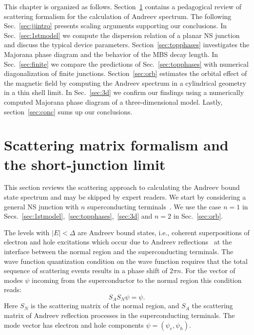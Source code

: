 This chapter is organized as follows.
Section~\ref{sec:formalism} contains a pedagogical review of scattering formalism for the calculation of Andreev spectrum.
The following Sec.~\ref{sec:jjintro} presents scaling arguments supporting our conclusions.
In Sec.~\ref{sec:1stmodel} we compute the dispersion relation of a planar NS junction and discuss the typical device parameters.
Section~\ref{sec:topphases} investigates the Majorana phase diagram and the behavior of the MBS decay length.
In Sec.~\ref{sec:finite} we compare the predictions of Sec.~\ref{sec:topphases} with numerical diagonalization of finite junctions.
Section~\ref{sec:orb} estimates the orbital effect of the magnetic field by computing the Andreev spectrum in a cylindrical geometry in a thin shell limit.
In Sec.~\ref{sec:3d} we confirm our findings using a numerically computed Majorana phase diagram of a three-dimensional model.
Lastly, section~\ref{sec:conc} sums up our conclusions.

\section{Scattering matrix formalism and the short-junction limit}
\label{sec:formalism}
This section reviews the scattering approach to calculating the Andreev bound state spectrum and may be skipped by expert readers.
We start by considering a general NS junction with $n$ superconducting terminals~\cite{Heck2014}.
We use the case $n=1$ in Secs.~\ref{sec:1stmodel},~\ref{sec:topphases},~\ref{sec:3d} and $n=2$ in Sec.~\ref{sec:orb}.

The levels with $|E|<\Delta$ are Andreev bound states, i.e., coherent superpositions of electron and hole excitations which occur due to Andreev reflections~\cite{Andreev1964} at the interface between the normal region and the superconducting terminals.
The wave function quantization condition on the wave function requires that the total sequence of scattering events results in a phase shift of $2\pi n$.
For the vector of modes $\psi$ incoming from the superconductor to the normal region this condition reads:
\begin{equation}\label{bound}
S_A S_N\psi=\psi.
\end{equation}
Here $S_N$ is the scattering matrix of the normal region, and $S_A$ the scattering matrix of Andreev reflection processes in the superconducting terminals.
The mode vector has electron and hole components $\psi=(\psi_e, \psi_h)$.

